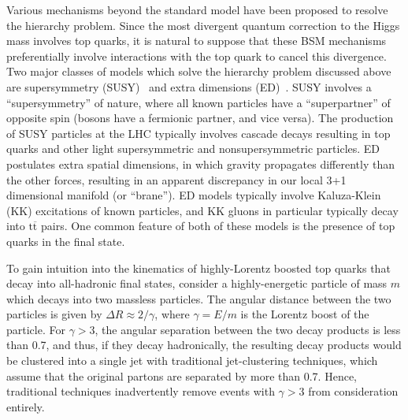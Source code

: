 \documentclass[12pt]{proposalnsf}
\newcommand{\ttbar}        {\ensuremath{\mathrm{t}\overline{\mathrm{t}}}}
\begin{document}
Various mechanisms beyond the standard model
have been proposed to resolve the hierarchy problem.
Since the most divergent 
quantum correction to the Higgs mass
involves top quarks, it is natural to suppose
that these BSM mechanisms preferentially involve interactions with the
top quark to cancel this divergence.
Two major classes of models which solve the hierarchy problem
discussed above are supersymmetry
(SUSY)~\cite{Gunion:1987qv,Feng:1999mn,Kitano:2006gv,Barbieri:2009ev,Horton:2009ed}
and extra dimensions (ED)~\cite{ed,rs1,rs2,rs_gluon_1}. SUSY involves
a ``supersymmetry'' of nature, where all known particles have a
``superpartner'' of opposite spin (bosons have a fermionic partner,
and vice versa). The production of SUSY particles at the LHC typically
involves cascade decays resulting in top quarks and other light
supersymmetric and nonsupersymmetric particles. ED postulates extra
spatial dimensions, in which gravity propagates differently than the
other forces, resulting in an apparent discrepancy in our local 3+1 dimensional
manifold (or ``brane''). ED models typically involve
Kaluza-Klein (KK) excitations of known particles, and KK gluons in
particular typically decay into $\ttbar$ pairs. 
One common feature of both of these models is the presence of top
quarks in the final state. 


To gain intuition into the kinematics of highly-Lorentz boosted top
quarks that decay into all-hadronic final states, consider
a highly-energetic particle
of mass $m$ which decays into two massless particles. The angular
distance between the two particles is given by 
$\Delta R \approx 2 / \gamma$, where $\gamma = E/m$ is the
Lorentz boost of the particle. 
For $\gamma > 3$, the angular separation
between the two decay products is less than 0.7, and thus, if
they decay hadronically,
the resulting decay products would be clustered into a 
single jet with traditional
jet-clustering techniques, which assume that the original partons
are separated by more than 0.7. Hence, traditional
techniques inadvertently remove events with $\gamma > 3$ from
consideration entirely. 
\end{document}
